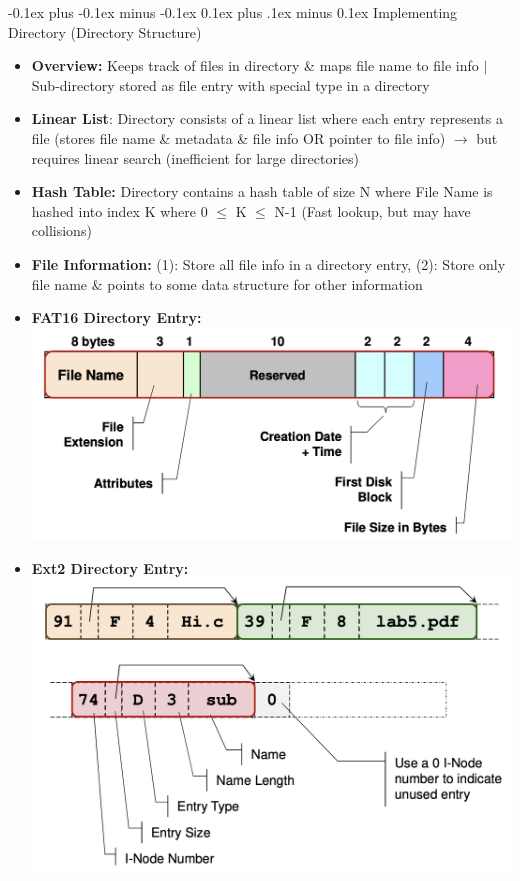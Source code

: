\documentclass[landscape]{article}
\makeatletter
\renewcommand{\subsection}{\@startsection{subsection}{2}{0mm}%
  {-0.1ex plus -0.1ex minus -0.1ex}%
  {0.1ex plus .1ex minus 0.1ex}%
{\normalfont\scriptsize\bfseries}}
\makeatother
\begin{document}
\begin{multicols*}{6}
    \subsection{Implementing Directory (Directory Structure)}
    \begin{itemize}
      \item \textbf{Overview:} Keeps track of files in directory \& maps file name to file info $\vert$ Sub-directory stored as file entry with special type in a directory
      \item \textbf{Linear List}: Directory consists of a linear list where each entry represents a file (stores file name \& metadata \& file info OR pointer to file info) $\rightarrow$ but requires linear search (inefficient for large directories)
      \item \textbf{Hash Table:} Directory contains a hash table of size N where File Name is hashed into index K where 0 $\leq$ K $\leq$ N-1 (Fast lookup, but may have collisions)
      \item \textbf{File Information:} (1): Store all file info in a directory entry, (2): Store only file name \& points to some data structure for other information
      \item \textbf{FAT16 Directory Entry:}
      \includegraphics[width=1.0\linewidth]{23_fat16_dir_entry.png}
      \item \textbf{Ext2 Directory Entry:}
      \includegraphics[width=1.0\linewidth]{24_ext2_dir_entry.png}
    \end{itemize}


\end{multicols*}
\end{document}
